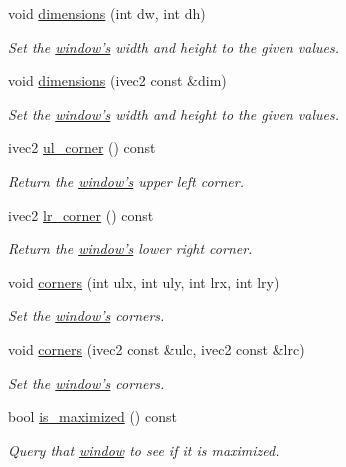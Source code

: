 \begin{DoxyCompactItemize}
void \hyperlink{classgfx_1_1window_a03f3685e4e89eb5fdffeb083bdec561d}{dimensions} (int dw, int dh)
\begin{DoxyCompactList}\small\item\em Set the \hyperlink{classgfx_1_1window}{window's} width and height to the given values. \end{DoxyCompactList}\item 
void \hyperlink{classgfx_1_1window_a023153ae51b73dc6907c73f66209af0d}{dimensions} (ivec2 const \&dim)
\begin{DoxyCompactList}\small\item\em Set the \hyperlink{classgfx_1_1window}{window's} width and height to the given values. \end{DoxyCompactList}\item 
ivec2 \hyperlink{classgfx_1_1window_adc983eae8a3faab2a51ca118e8df0ad3}{ul\-\_\-corner} () const 
\begin{DoxyCompactList}\small\item\em Return the \hyperlink{classgfx_1_1window}{window's} upper left corner. \end{DoxyCompactList}\item 
ivec2 \hyperlink{classgfx_1_1window_a74e3177b1f1c64ed653848afd648749c}{lr\-\_\-corner} () const 
\begin{DoxyCompactList}\small\item\em Return the \hyperlink{classgfx_1_1window}{window's} lower right corner. \end{DoxyCompactList}\item 
void \hyperlink{classgfx_1_1window_afc375a6888fb2f5fffa75b6d4d1e407e}{corners} (int ulx, int uly, int lrx, int lry)
\begin{DoxyCompactList}\small\item\em Set the \hyperlink{classgfx_1_1window}{window's} corners. \end{DoxyCompactList}\item 
void \hyperlink{classgfx_1_1window_a37662d40ab8b6b3ac7f95ddebf98b29b}{corners} (ivec2 const \&ulc, ivec2 const \&lrc)
\begin{DoxyCompactList}\small\item\em Set the \hyperlink{classgfx_1_1window}{window's} corners. \end{DoxyCompactList}\item 
bool \hyperlink{classgfx_1_1window_aba18ff6d277ed78d54fe7e227ba655a1}{is\-\_\-maximized} () const 
\begin{DoxyCompactList}\small\item\em Query that \hyperlink{classgfx_1_1window}{window} to see if it is maximized. \end{DoxyCompactList}\item 

\end{DoxyCompactItemize}
